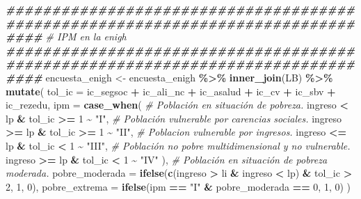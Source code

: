 \documentclass[
  12pt,
]{book}
\newenvironment{Shaded}{\begin{snugshade}}{\end{snugshade}}
\newcommand{\AttributeTok}[1]{\textcolor[rgb]{0.13,0.29,0.53}{#1}}
\newcommand{\CommentTok}[1]{\textcolor[rgb]{0.56,0.35,0.01}{\textit{#1}}}
\newcommand{\DecValTok}[1]{\textcolor[rgb]{0.00,0.00,0.81}{#1}}
\newcommand{\DocumentationTok}[1]{\textcolor[rgb]{0.56,0.35,0.01}{\textbf{\textit{#1}}}}
\newcommand{\FunctionTok}[1]{\textcolor[rgb]{0.13,0.29,0.53}{\textbf{#1}}}
\newcommand{\NormalTok}[1]{#1}
\newcommand{\OtherTok}[1]{\textcolor[rgb]{0.56,0.35,0.01}{#1}}
\newcommand{\SpecialCharTok}[1]{\textcolor[rgb]{0.81,0.36,0.00}{\textbf{#1}}}
\newcommand{\StringTok}[1]{\textcolor[rgb]{0.31,0.60,0.02}{#1}}
\begin{document}
\begin{Shaded}
\begin{Highlighting}[]
\DocumentationTok{\#\#\#\#\#\#\#\#\#\#\#\#\#\#\#\#\#\#\#\#\#\#\#\#\#\#\#\#\#\#\#\#\#\#\#\#\#\#\#\#\#\#\#\#\#\#\#\#\#\#\#\#\#\#\#\#\#\#\#\#\#\#\#\#\#\#\#\#\#\#\#\#\#\#\#\#\#\#\#\#}
\CommentTok{\# IPM en la enigh}
\DocumentationTok{\#\#\#\#\#\#\#\#\#\#\#\#\#\#\#\#\#\#\#\#\#\#\#\#\#\#\#\#\#\#\#\#\#\#\#\#\#\#\#\#\#\#\#\#\#\#\#\#\#\#\#\#\#\#\#\#\#\#\#\#\#\#\#\#\#\#\#\#\#\#\#\#\#\#\#\#\#\#\#\#}
\NormalTok{encuesta\_enigh }\OtherTok{\textless{}{-}}
\NormalTok{  encuesta\_enigh }\SpecialCharTok{\%\textgreater{}\%} \FunctionTok{inner\_join}\NormalTok{(LB)  }\SpecialCharTok{\%\textgreater{}\%} 
  \FunctionTok{mutate}\NormalTok{(}
    \AttributeTok{tol\_ic =}\NormalTok{ ic\_segsoc }\SpecialCharTok{+}\NormalTok{ ic\_ali\_nc }\SpecialCharTok{+}\NormalTok{ ic\_asalud }\SpecialCharTok{+}\NormalTok{ ic\_cv }\SpecialCharTok{+}\NormalTok{  ic\_sbv }\SpecialCharTok{+}\NormalTok{ ic\_rezedu,}
    \AttributeTok{ipm   =} \FunctionTok{case\_when}\NormalTok{(}
      \CommentTok{\# Población en situación de pobreza.}
\NormalTok{      ingreso }\SpecialCharTok{\textless{}}\NormalTok{ lp  }\SpecialCharTok{\&}\NormalTok{  tol\_ic }\SpecialCharTok{\textgreater{}=} \DecValTok{1} \SpecialCharTok{\textasciitilde{}} \StringTok{"I"}\NormalTok{,}
      \CommentTok{\# Población vulnerable por carencias sociales.}
\NormalTok{      ingreso }\SpecialCharTok{\textgreater{}=}\NormalTok{ lp }\SpecialCharTok{\&}\NormalTok{ tol\_ic }\SpecialCharTok{\textgreater{}=} \DecValTok{1} \SpecialCharTok{\textasciitilde{}} \StringTok{"II"}\NormalTok{,}
      \CommentTok{\# Poblacion vulnerable por ingresos.}
\NormalTok{      ingreso }\SpecialCharTok{\textless{}=}\NormalTok{ lp }\SpecialCharTok{\&}\NormalTok{ tol\_ic }\SpecialCharTok{\textless{}} \DecValTok{1} \SpecialCharTok{\textasciitilde{}} \StringTok{"III"}\NormalTok{,}
      \CommentTok{\# Población no pobre multidimensional y no vulnerable.}
\NormalTok{      ingreso }\SpecialCharTok{\textgreater{}=}\NormalTok{ lp }\SpecialCharTok{\&}\NormalTok{ tol\_ic }\SpecialCharTok{\textless{}} \DecValTok{1} \SpecialCharTok{\textasciitilde{}} \StringTok{"IV"}
\NormalTok{    ),}
    \CommentTok{\# Población en situación de pobreza moderada.}
    \AttributeTok{pobre\_moderada =} \FunctionTok{ifelse}\NormalTok{(}\FunctionTok{c}\NormalTok{(ingreso }\SpecialCharTok{\textgreater{}}\NormalTok{ li }\SpecialCharTok{\&}\NormalTok{ ingreso }\SpecialCharTok{\textless{}}\NormalTok{ lp) }\SpecialCharTok{\&}
\NormalTok{                              tol\_ic }\SpecialCharTok{\textgreater{}} \DecValTok{2}\NormalTok{, }\DecValTok{1}\NormalTok{, }\DecValTok{0}\NormalTok{),}
    \AttributeTok{pobre\_extrema =} \FunctionTok{ifelse}\NormalTok{(ipm }\SpecialCharTok{==} \StringTok{"I"} \SpecialCharTok{\&}\NormalTok{ pobre\_moderada }\SpecialCharTok{==} \DecValTok{0}\NormalTok{, }\DecValTok{1}\NormalTok{, }\DecValTok{0}\NormalTok{)}
\NormalTok{  )}
\end{Highlighting}
\end{Shaded}
\end{document}

